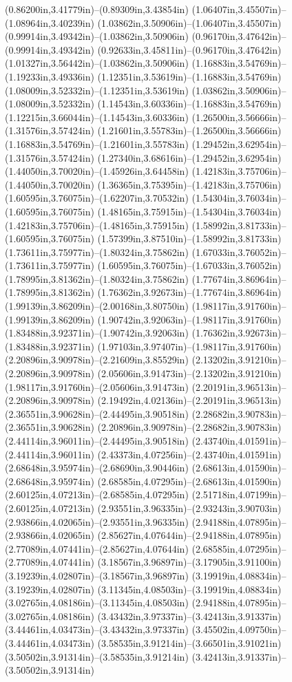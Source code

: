 (0.86200in,3.41779in)--(0.89309in,3.43854in) (1.06407in,3.45507in)--(1.08964in,3.40239in) (1.03862in,3.50906in)--(1.06407in,3.45507in) (0.99914in,3.49342in)--(1.03862in,3.50906in) (0.96170in,3.47642in)--(0.99914in,3.49342in) (0.92633in,3.45811in)--(0.96170in,3.47642in) (1.01327in,3.56442in)--(1.03862in,3.50906in) (1.16883in,3.54769in)--(1.19233in,3.49336in) (1.12351in,3.53619in)--(1.16883in,3.54769in) (1.08009in,3.52332in)--(1.12351in,3.53619in) (1.03862in,3.50906in)--(1.08009in,3.52332in) (1.14543in,3.60336in)--(1.16883in,3.54769in) (1.12215in,3.66044in)--(1.14543in,3.60336in) (1.26500in,3.56666in)--(1.31576in,3.57424in) (1.21601in,3.55783in)--(1.26500in,3.56666in) (1.16883in,3.54769in)--(1.21601in,3.55783in) (1.29452in,3.62954in)--(1.31576in,3.57424in) (1.27340in,3.68616in)--(1.29452in,3.62954in) (1.44050in,3.70020in)--(1.45926in,3.64458in) (1.42183in,3.75706in)--(1.44050in,3.70020in) (1.36365in,3.75395in)--(1.42183in,3.75706in) (1.60595in,3.76075in)--(1.62207in,3.70532in) (1.54304in,3.76034in)--(1.60595in,3.76075in) (1.48165in,3.75915in)--(1.54304in,3.76034in) (1.42183in,3.75706in)--(1.48165in,3.75915in) (1.58992in,3.81733in)--(1.60595in,3.76075in) (1.57399in,3.87510in)--(1.58992in,3.81733in) (1.73611in,3.75977in)--(1.80324in,3.75862in) (1.67033in,3.76052in)--(1.73611in,3.75977in) (1.60595in,3.76075in)--(1.67033in,3.76052in) (1.78995in,3.81362in)--(1.80324in,3.75862in) (1.77674in,3.86964in)--(1.78995in,3.81362in) (1.76362in,3.92673in)--(1.77674in,3.86964in) (1.99139in,3.86209in)--(2.00168in,3.80750in) (1.98117in,3.91760in)--(1.99139in,3.86209in) (1.90742in,3.92063in)--(1.98117in,3.91760in) (1.83488in,3.92371in)--(1.90742in,3.92063in) (1.76362in,3.92673in)--(1.83488in,3.92371in) (1.97103in,3.97407in)--(1.98117in,3.91760in) (2.20896in,3.90978in)--(2.21609in,3.85529in) (2.13202in,3.91210in)--(2.20896in,3.90978in) (2.05606in,3.91473in)--(2.13202in,3.91210in) (1.98117in,3.91760in)--(2.05606in,3.91473in) (2.20191in,3.96513in)--(2.20896in,3.90978in) (2.19492in,4.02136in)--(2.20191in,3.96513in) (2.36551in,3.90628in)--(2.44495in,3.90518in) (2.28682in,3.90783in)--(2.36551in,3.90628in) (2.20896in,3.90978in)--(2.28682in,3.90783in) (2.44114in,3.96011in)--(2.44495in,3.90518in) (2.43740in,4.01591in)--(2.44114in,3.96011in) (2.43373in,4.07256in)--(2.43740in,4.01591in) (2.68648in,3.95974in)--(2.68690in,3.90446in) (2.68613in,4.01590in)--(2.68648in,3.95974in) (2.68585in,4.07295in)--(2.68613in,4.01590in) (2.60125in,4.07213in)--(2.68585in,4.07295in) (2.51718in,4.07199in)--(2.60125in,4.07213in) (2.93551in,3.96335in)--(2.93243in,3.90703in) (2.93866in,4.02065in)--(2.93551in,3.96335in) (2.94188in,4.07895in)--(2.93866in,4.02065in) (2.85627in,4.07644in)--(2.94188in,4.07895in) (2.77089in,4.07441in)--(2.85627in,4.07644in) (2.68585in,4.07295in)--(2.77089in,4.07441in) (3.18567in,3.96897in)--(3.17905in,3.91100in) (3.19239in,4.02807in)--(3.18567in,3.96897in) (3.19919in,4.08834in)--(3.19239in,4.02807in) (3.11345in,4.08503in)--(3.19919in,4.08834in) (3.02765in,4.08186in)--(3.11345in,4.08503in) (2.94188in,4.07895in)--(3.02765in,4.08186in) (3.43432in,3.97337in)--(3.42413in,3.91337in) (3.44461in,4.03473in)--(3.43432in,3.97337in) (3.45502in,4.09750in)--(3.44461in,4.03473in) (3.58535in,3.91214in)--(3.66501in,3.91021in) (3.50502in,3.91314in)--(3.58535in,3.91214in) (3.42413in,3.91337in)--(3.50502in,3.91314in) 